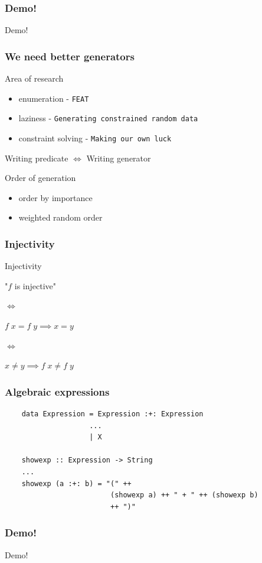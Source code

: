 \documentclass{beamer}
\begin{document}
\begin{frame}
    \frametitle{Demo!}
        \Huge{\centerline{Demo!}}
\end{frame}

\begin{frame}
    \frametitle{We need better generators}
        Area of research
        \begin{itemize}
            \item enumeration - \texttt{FEAT}
            \item laziness - \texttt{Generating constrained random data}
            \item constraint solving - \texttt{Making our own luck}
        \end{itemize}
        Writing predicate $\iff$ Writing generator\\
        \centerline{}
        Order of generation
        \begin{itemize}
            \item order by importance
            \item weighted random order
        \end{itemize}
\end{frame}

\begin{frame}
    \frametitle{Injectivity}
        \begin{block}{Injectivity}
            \centerline{"$f$ is injective"}
            \centerline{$\iff$}
            \centerline{$f\;x=f\;y\implies x = y$}
            \centerline{$\iff$}
            \centerline{$x \neq y \implies f\;x\neq f\;y$}
        \end{block}
\end{frame}

\begin{frame}[fragile]
    \frametitle{Algebraic expressions}
    \begin{verbatim}
    data Expression = Expression :+: Expression
                    ...
                    | X

    showexp :: Expression -> String
    ...
    showexp (a :+: b) = "(" ++
                         (showexp a) ++ " + " ++ (showexp b)
                         ++ ")"
    \end{verbatim}
\end{frame}

\begin{frame}
    \frametitle{Demo!}
        \Huge{\centerline{Demo!}}
\end{frame}
\end{document}
